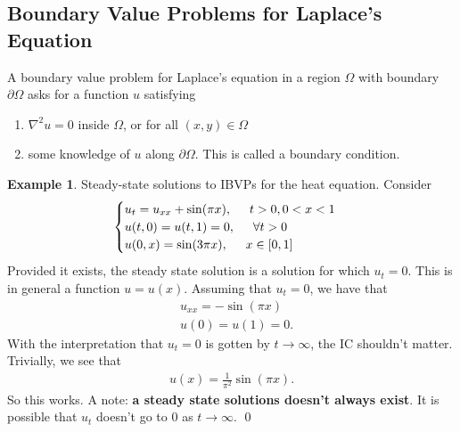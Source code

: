 \documentclass{article}
\theoremstyle{definition}
\newtheorem{exmp}{Example}[section]
\newcommand{\p}{\partial}
\newcommand{\f}[2]{\frac{#1}{#2}}
\begin{document}
\subsection{Boundary Value Problems for Laplace's Equation}

A boundary value problem for Laplace's equation in a region $\Omega$ with boundary $\p \Omega$ asks for a function $u$ satisfying
\begin{enumerate}
	\item $\nabla^2 u = 0 $ inside $\Omega$, or for all $(x,y)\in \Omega$
	\item some knowledge of $u$ along $\p \Omega$. This is called a boundary condition.
\end{enumerate}

	
	\begin{exmp}
		Steady-state solutions to IBVPs for the heat equation. Consider
		\begin{align*}
		\begin{cases}
		u_t = u_{xx} + \sin(\pi x), \hspace{0.5cm} t>0, 0<x<1\\
		u(t,0) = u(t,1) = 0,\hspace{0.5cm} \forall t >0\\
		u(0,x) = \sin(3\pi x),\hspace{0.5cm} x\in [0,1]
		\end{cases}
		\end{align*}
		Provided it exists, the steady state solution is a solution for which $u_t = 0$. This is in general a function $u = u(x)$. Assuming that $u_t = 0$, we have that
		\begin{align*}
		&u_{xx} = -\sin(\pi x)\\
		&u(0) = u(1) = 0.
		\end{align*}
		With the interpretation that $u_t = 0$ is gotten by $t\to \infty$, the IC shouldn't matter. Trivially, we see that 
		\begin{align*}
		u(x) = \f{1}{\pi^2}\sin(\pi x).
		\end{align*}
		So this works. A note: \textbf{a steady state solutions doesn't always exist}. It is possible that $u_t$ doesn't go to 0 as $t\to \infty$. 
		\qed
	\end{exmp}
\end{document}
